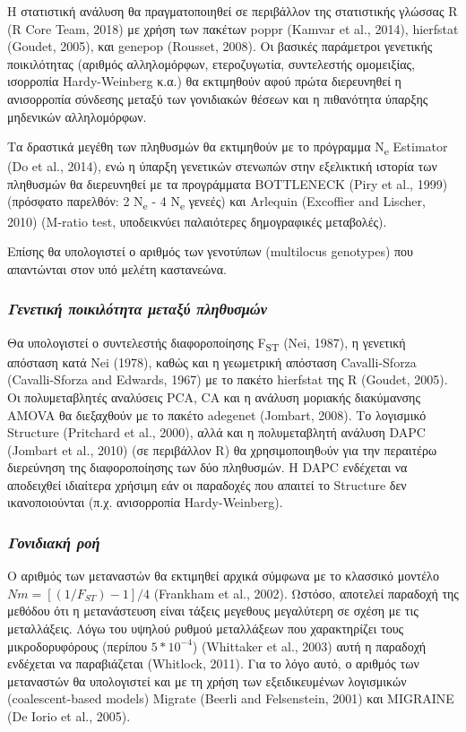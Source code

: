 \documentclass[12pt,a4paper,]{report}
\begin{document}
Η στατιστική ανάλυση θα πραγματοποιηθεί σε περιβάλλον της στατιστικής
γλώσσας R (R Core Team, 2018) με χρήση των πακέτων poppr (Kamvar et al.,
2014), hierfstat (Goudet, 2005), και genepop (Rousset, 2008). Οι βασικές
παράμετροι γενετικής ποικιλότητας (αριθμός αλληλομόρφων, ετεροζυγωτία,
συντελεστής ομομειξίας, ισορροπία Hardy-Weinberg κ.α.) θα εκτιμηθούν
αφού πρώτα διερευνηθεί η ανισορροπία σύνδεσης μεταξύ των γονιδιακών
θέσεων και η πιθανότητα ύπαρξης μηδενικών αλληλομόρφων.

Τα δραστικά μεγέθη των πληθυσμών θα εκτιμηθούν με το πρόγραμμα
N\textsubscript{e} Estimator (Do et al., 2014), ενώ η ύπαρξη γενετικών
στενωπών στην εξελικτική ιστορία των πληθυσμών θα διερευνηθεί με τα
προγράμματα BOTTLENECK (Piry et al., 1999) (πρόσφατο παρελθόν: 2
N\textsubscript{e} - 4 N\textsubscript{e} γενεές) και Arlequin
(Excoffier and Lischer, 2010) (M-ratio test, υποδεικνύει παλαιότερες
δημογραφικές μεταβολές).

Επίσης θα υπολογιστεί ο αριθμός των γενοτύπων (multilocus genotypes) που
απαντώνται στον υπό μελέτη καστανεώνα.

\hypertarget{---}{%
\subsubsection{\texorpdfstring{\emph{Γενετική ποικιλότητα μεταξύ
πληθυσμών}}{Γενετική ποικιλότητα μεταξύ πληθυσμών}}\label{---}}

Θα υπολογιστεί ο συντελεστής διαφοροποίησης F\textsubscript{ST} (Nei,
1987), η γενετική απόσταση κατά Nei (1978), καθώς και η γεωμετρική
απόσταση Cavalli-Sforza (Cavalli-Sforza and Edwards, 1967) με το πακέτο
hierfstat της R (Goudet, 2005). Οι πολυμεταβλητές αναλύσεις PCA, CA και
η ανάλυση μοριακής διακύμανσης AMOVA θα διεξαχθούν με το πακέτο adegenet
(Jombart, 2008). Το λογισμικό Structure (Pritchard et al., 2000), αλλά
και η πολυμεταβλητή ανάλυση DAPC (Jombart et al., 2010) (σε περιβάλλον
R) θα χρησιμοποιηθoύν για την περαιτέρω διερεύνηση της διαφοροποίησης
των δύο πληθυσμών. H DAPC ενδέχεται να αποδειχθεί ιδιαίτερα χρήσιμη εάν
οι παραδοχές που απαιτεί το Structure δεν ικανοποιούνται (π.χ.
ανισορροπία Hardy-Weinberg).

\hypertarget{-}{%
\subsubsection{\texorpdfstring{\emph{Γονιδιακή
ροή}}{Γονιδιακή ροή}}\label{-}}

Ο αριθμός των μεταναστών θα εκτιμηθεί αρχικά σύμφωνα με το κλασσικό
μοντέλο \(Nm = [(1 / F_{ST}) - 1] / 4\) (Frankham et al., 2002). Ωστόσο,
αποτελεί παραδοχή της μεθόδου ότι η μετανάστευση είναι τάξεις μεγεθους
μεγαλύτερη σε σχέση με τις μεταλλάξεις. Λόγω του υψηλού ρυθμού
μεταλλάξεων που χαρακτηρίζει τους μικροδορυφόρους (περίπου
\(5 * 10^{-4}\)) (Whittaker et al., 2003) αυτή η παραδοχή ενδέχεται να
παραβιάζεται (Whitlock, 2011). Για το λόγο αυτό, ο αριθμός των
μεταναστών θα υπολογιστεί και με τη χρήση των εξειδικευμένων λογισμικών
(coalescent-based models) Migrate (Beerli and Felsenstein, 2001) και
MIGRAINE (De Iorio et al., 2005).
\end{document}
